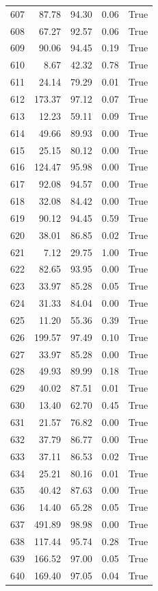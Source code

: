 \begin{longtable}{rrrrr}
607 & 87.78 & 94.30 & 0.06 & True \\
608 & 67.27 & 92.57 & 0.06 & True \\
609 & 90.06 & 94.45 & 0.19 & True \\
610 & 8.67 & 42.32 & 0.78 & True \\
611 & 24.14 & 79.29 & 0.01 & True \\
612 & 173.37 & 97.12 & 0.07 & True \\
613 & 12.23 & 59.11 & 0.09 & True \\
614 & 49.66 & 89.93 & 0.00 & True \\
615 & 25.15 & 80.12 & 0.00 & True \\
616 & 124.47 & 95.98 & 0.00 & True \\
617 & 92.08 & 94.57 & 0.00 & True \\
618 & 32.08 & 84.42 & 0.00 & True \\
619 & 90.12 & 94.45 & 0.59 & True \\
620 & 38.01 & 86.85 & 0.02 & True \\
621 & 7.12 & 29.75 & 1.00 & True \\
622 & 82.65 & 93.95 & 0.00 & True \\
623 & 33.97 & 85.28 & 0.05 & True \\
624 & 31.33 & 84.04 & 0.00 & True \\
625 & 11.20 & 55.36 & 0.39 & True \\
626 & 199.57 & 97.49 & 0.10 & True \\
627 & 33.97 & 85.28 & 0.00 & True \\
628 & 49.93 & 89.99 & 0.18 & True \\
629 & 40.02 & 87.51 & 0.01 & True \\
630 & 13.40 & 62.70 & 0.45 & True \\
631 & 21.57 & 76.82 & 0.00 & True \\
632 & 37.79 & 86.77 & 0.00 & True \\
633 & 37.11 & 86.53 & 0.02 & True \\
634 & 25.21 & 80.16 & 0.01 & True \\
635 & 40.42 & 87.63 & 0.00 & True \\
636 & 14.40 & 65.28 & 0.05 & True \\
637 & 491.89 & 98.98 & 0.00 & True \\
638 & 117.44 & 95.74 & 0.28 & True \\
639 & 166.52 & 97.00 & 0.05 & True \\
640 & 169.40 & 97.05 & 0.04 & True \\

\end{longtable}
